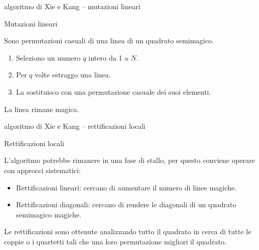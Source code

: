 \documentclass[10pt]{beamer}
\begin{document}
\begin{frame}{algoritmo di Xie e Kang -- mutazioni lineari}
	\begin{block}{Mutazioni lineari}
		\parbox{0.97\columnwidth}{
			 Sono permutazioni casuali di una linea di un quadrato semimagico.
			 \begin{enumerate}
				\item Seleziono un numero $ q $ intero da 1 a $ N $.
				\item Per $ q $ volte estraggo una linea.
				\item La sostituisco con una permutazione casuale dei suoi elementi.
			\end{enumerate}
			
			La linea rimane magica.
		}
	\end{block}
\end{frame}

\begin{frame}{algoritmo di Xie e Kang -- rettificazioni locali}
	\begin{block}{Rettificazioni locali}
		\parbox{0.98\columnwidth}{
			L'algoritmo potrebbe rimanere in una fase di stallo, per questo conviene operare con approcci sistematici:
			\begin{itemize}
				\item \alert{Rettificazioni lineari}: cercano di aumentare il numero di linee magiche.
				\item \alert{Rettificazioni diagonali}: cercano di rendere le diagonali di un quadrato semimagico magiche.
			\end{itemize}
			Le rettificazioni sono ottenute analizzando tutto il quadrato in cerca di tutte le coppie o i quartetti tali che una loro permutazione migliori il quadrato. 
		}
	\end{block}
\end{frame}
\end{document}
